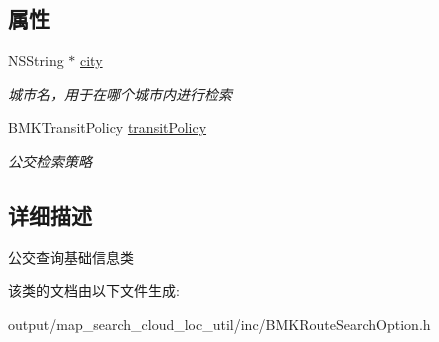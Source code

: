 \subsection*{属性}
\begin{DoxyCompactItemize}
\item 
\hypertarget{interface_b_m_k_transit_route_plan_option_ad3060cccd7cae43c4564a42f19b972aa}{N\+S\+String $\ast$ \hyperlink{interface_b_m_k_transit_route_plan_option_ad3060cccd7cae43c4564a42f19b972aa}{city}}\label{interface_b_m_k_transit_route_plan_option_ad3060cccd7cae43c4564a42f19b972aa}

\begin{DoxyCompactList}\small\item\em 城市名，用于在哪个城市内进行检索 \end{DoxyCompactList}\item 
\hypertarget{interface_b_m_k_transit_route_plan_option_a78e87e470653062316a53e6e8e5399e5}{B\+M\+K\+Transit\+Policy \hyperlink{interface_b_m_k_transit_route_plan_option_a78e87e470653062316a53e6e8e5399e5}{transit\+Policy}}\label{interface_b_m_k_transit_route_plan_option_a78e87e470653062316a53e6e8e5399e5}

\begin{DoxyCompactList}\small\item\em 公交检索策略 \end{DoxyCompactList}\end{DoxyCompactItemize}


\subsection{详细描述}
公交查询基础信息类 

该类的文档由以下文件生成\+:\begin{DoxyCompactItemize}
\item 
output/map\+\_\+search\+\_\+cloud\+\_\+loc\+\_\+util/inc/B\+M\+K\+Route\+Search\+Option.\+h\end{DoxyCompactItemize}
